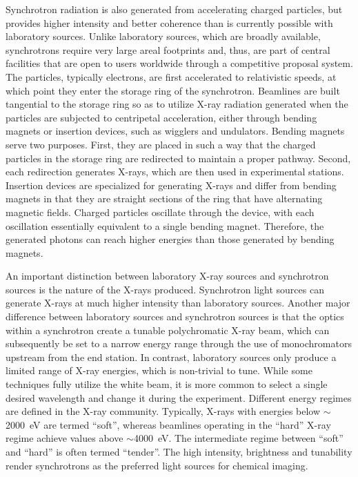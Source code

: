 \documentclass[journal=cmatex,manuscript=perspective]{achemso}
\begin{document}
Synchrotron radiation is also generated from accelerating charged
particles, but provides higher intensity and better coherence than is
currently possible with laboratory sources. Unlike laboratory sources,
which are broadly available, synchrotrons require very large areal
footprints and, thus, are part of central facilities that are open to
users worldwide through a competitive proposal system. The particles,
typically electrons, are first accelerated to relativistic speeds, at
which point they enter the storage ring of the synchrotron. Beamlines
are built tangential to the storage ring so as to utilize X-ray
radiation generated when the particles are subjected to centripetal
acceleration, either through bending magnets or insertion devices,
such as wigglers and undulators. Bending magnets serve two
purposes. First, they are placed in such a way that the charged
particles in the storage ring are redirected to maintain a proper
pathway. Second, each redirection generates X-rays, which are then
used in experimental stations. Insertion devices are specialized for
generating X-rays and differ from bending magnets in that they are
straight sections of the ring that have alternating magnetic
fields. Charged particles oscillate through the device, with each
oscillation essentially equivalent to a single bending
magnet. Therefore, the generated photons can reach higher energies
than those generated by bending magnets\cite{synchrotronradiation}.

An important distinction between laboratory X-ray sources and
synchrotron sources is the nature of the X-rays produced. Synchrotron
light sources can generate X-rays at much higher intensity than
laboratory sources. Another major difference between laboratory
sources and synchrotron sources is that the optics within a
synchrotron create a tunable polychromatic X-ray beam, which can
subsequently be set to a narrow energy range through the use of
monochromators upstream from the end station. In contrast, laboratory
sources only produce a limited range of X-ray energies, which is
non-trivial to tune. While some techniques fully utilize the white
beam\cite{ice2009}, it is more common to select a single desired
wavelength and change it during the experiment. Different energy
regimes are defined in the X-ray community. Typically, X-rays with
energies below $\sim$\SI{2000}{eV} are termed ``soft'', whereas
beamlines operating in the ``hard'' X-ray regime achieve values above
$\sim$\SI{4000}{eV}. The intermediate regime between ``soft'' and
``hard'' is often termed ``tender''. The high intensity, brightness
and tunability render synchrotrons as the preferred light sources for
chemical imaging.
\end{document}
